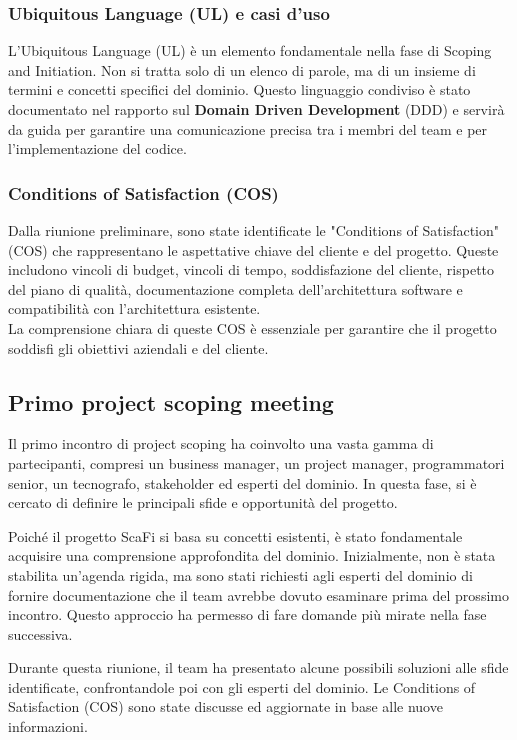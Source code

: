\subsubsection{Ubiquitous Language (UL) e casi d'uso}
L'Ubiquitous Language (UL) è un elemento fondamentale nella fase di Scoping and Initiation. Non si
tratta solo di un elenco di parole, ma di un insieme di termini e concetti specifici del dominio.
Questo linguaggio condiviso è stato documentato nel rapporto sul \textbf{Domain Driven Development}
(DDD) e servirà da guida per garantire una comunicazione precisa tra i membri del team e per
l'implementazione del codice.\\

\subsubsection{Conditions of Satisfaction (COS)}
Dalla riunione preliminare, sono state identificate le "Conditions of Satisfaction" (COS) che rappresentano
le aspettative chiave del cliente e del progetto. Queste includono vincoli di budget, vincoli di tempo,
soddisfazione del cliente, rispetto del piano di qualità, documentazione completa dell'architettura
software e compatibilità con l'architettura esistente.\\

La comprensione chiara di queste COS è essenziale per garantire che il progetto soddisfi gli obiettivi
aziendali e del cliente.\\

\subsection{Primo project scoping meeting}
Il primo incontro di project scoping ha coinvolto una vasta gamma di partecipanti, compresi un business manager, un project manager, 
programmatori senior, un tecnografo, stakeholder ed esperti del dominio. In questa fase, si è cercato di definire le principali sfide 
e opportunità del progetto.

Poiché il progetto ScaFi si basa su concetti esistenti, è stato fondamentale acquisire una comprensione approfondita del dominio. 
Inizialmente, non è stata stabilita un'agenda rigida, ma sono stati richiesti agli esperti del dominio di fornire documentazione che il 
team avrebbe dovuto esaminare prima del prossimo incontro. Questo approccio ha permesso di fare domande più mirate nella fase successiva.

Durante questa riunione, il team ha presentato alcune possibili soluzioni alle sfide identificate, confrontandole poi con gli esperti 
del dominio. Le Conditions of Satisfaction (COS) sono state discusse ed aggiornate in base alle nuove informazioni.

